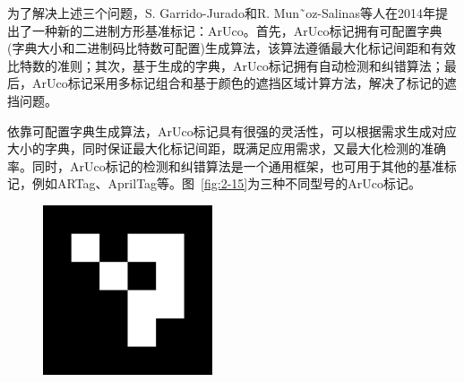 为了解决上述三个问题，S. Garrido-Jurado和R. Mun˜oz-Salinas等人在2014年提出了一种新的二进制方形基准标记：ArUco。首先，ArUco标记拥有可配置字典(字典大小和二进制码比特数可配置)生成算法，该算法遵循最大化标记间距和有效比特数的准则；其次，基于生成的字典，ArUco标记拥有自动检测和纠错算法；最后，ArUco标记采用多标记组合和基于颜色的遮挡区域计算方法，解决了标记的遮挡问题。

依靠可配置字典生成算法，ArUco标记具有很强的灵活性，可以根据需求生成对应大小的字典，同时保证最大化标记间距，既满足应用需求，又最大化检测的准确率。同时，ArUco标记的检测和纠错算法是一个通用框架，也可用于其他的基准标记，例如ARTag、AprilTag等。图~\ref{fig:2-15}为三种不同型号的ArUco标记。

\clearpage
\begin{figure}[htb]
	\begin{minipage}[t]{0.33\linewidth}
		\centering
		\includegraphics[width=\columnwidth]{figures/2-15a.png} 
		\label{fig:2-15a} 
	\end{minipage}
	\begin{minipage}[t]{0.33\linewidth} 
		\centering

\end{minipage}
\end{figure}
